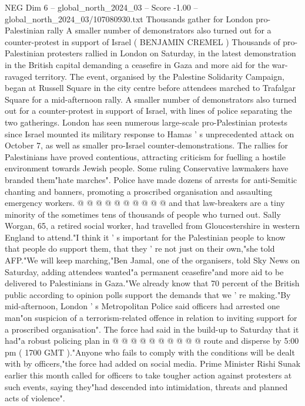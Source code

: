 \begin{textsample}{NEG Dim 6 – global\_north\_2024\_03 – Score -1.00 – global\_north\_2024\_03/107080930.txt}  \label{ex:f6_neg_397}
Thousands gather for London pro-Palestinian rally A smaller number of demonstrators also turned out for a counter-protest in support of Israel ( BENJAMIN CREMEL ) Thousands of pro-Palestinian protesters rallied in London on Saturday, in the latest demonstration in the British capital demanding a ceasefire in Gaza and more aid for the war-ravaged territory.
The event, organised by the Palestine Solidarity Campaign, began at Russell Square in the city centre before attendees marched to Trafalgar Square for a mid-afternoon rally.
A smaller number of demonstrators also turned out for a counter-protest in support of Israel, with lines of police separating the two gatherings.
London has seen numerous large-scale pro-Palestinian protests since Israel mounted its military response to Hamas ' s unprecedented attack on October 7, as well as smaller pro-Israel counter-demonstrations.
The rallies for Palestinians have proved contentious, attracting criticism for fuelling a hostile environment towards Jewish people.
Some ruling Conservative lawmakers have branded them"hate marches".
Police have made dozens of arrests for anti-Semitic chanting and banners, promoting a proscribed organisation and assaulting emergency workers. @ @ @ @ @ @ @ @ @ @ and that law-breakers are a tiny minority of the sometimes tens of thousands of people who turned out.
Sally Worgan, 65, a retired social worker, had travelled from Gloucestershire in western England to attend."I think it ' s important for the Palestinian people to know that people do support them, that they ' re not just on their own,"she told AFP."We will keep marching,"Ben Jamal, one of the organisers, told Sky News on Saturday, adding attendees wanted"a permanent ceasefire"and more aid to be delivered to Palestinians in Gaza."We already know that 70 percent of the British public according to opinion polls support the demands that we ' re making."By mid-afternoon, London ' s Metropolitan Police said officers had arrested one man"on suspicion of a terrorism-related offence in relation to inviting support for a proscribed organisation".
The force had said in the build-up to Saturday that it had"a robust policing plan in @ @ @ @ @ @ @ @ @ @ route and disperse by 5:00 pm ( 1700 GMT )."Anyone who fails to comply with the conditions will be dealt with by officers,"the force had added on social media.
Prime Minister Rishi Sunak earlier this month called for officers to take tougher action against protesters at such events, saying they"had descended into intimidation, threats and planned acts of violence".

\end{textsample}
